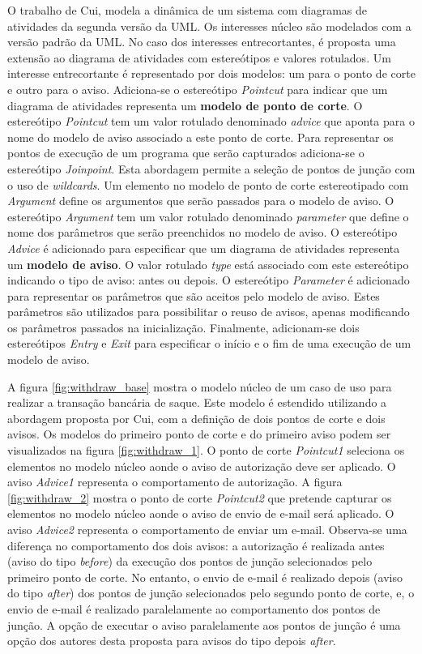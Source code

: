 O trabalho de Cui, \cite{Cui:2009:MIA:1529282.1529377} modela a dinâmica de um sistema com diagramas de atividades da segunda versão da UML. Os
interesses núcleo são modelados com a versão padrão da UML. No caso dos interesses entrecortantes, é proposta uma extensão ao diagrama de atividades com
estereótipos e valores rotulados. Um interesse entrecortante é representado por dois modelos: um para o ponto de corte e outro para o aviso.
Adiciona-se o estereótipo \textit{Pointcut} para indicar que um diagrama de atividades representa um \textbf{modelo de ponto de corte}. O estereótipo
\textit{Pointcut} tem um valor rotulado denominado \textit{advice} que aponta para o nome do modelo de aviso associado a este ponto de corte. Para
representar os pontos de execução de um programa que serão capturados adiciona-se o estereótipo \textit{Joinpoint}. Esta abordagem permite a seleção
de pontos de junção com o uso de \textit{wildcards}. Um elemento no modelo de ponto de corte estereotipado com \textit{Argument} define os argumentos
que serão passados para o modelo de aviso. O estereótipo \textit{Argument} tem um valor rotulado denominado \textit{parameter} que define o nome dos
parâmetros que serão preenchidos no modelo de aviso. O estereótipo \textit{Advice} é adicionado para especificar que um diagrama de atividades
representa um \textbf{modelo de aviso}. O valor rotulado \textit{type} está associado com este estereótipo indicando o tipo de aviso: antes ou depois.
O estereótipo \textit{Parameter} é adicionado para representar os parâmetros que são aceitos pelo modelo de aviso. Estes parâmetros são utilizados
para possibilitar o reuso de avisos, apenas modificando os parâmetros passados na inicialização. Finalmente, adicionam-se dois estereótipos
\textit{Entry} e \textit{Exit} para especificar o início e o fim de uma execução de um modelo de aviso.
 
 A figura \ref{fig:withdraw_base} mostra o modelo núcleo de um caso de uso para realizar a transação bancária de saque. Este modelo é estendido
 utilizando a abordagem proposta por Cui, com a definição de dois pontos de corte e dois avisos. Os modelos do primeiro ponto de corte e do
 primeiro aviso podem ser visualizados na figura \ref{fig:withdraw_1}. O ponto de corte \textit{Pointcut1} seleciona os elementos no modelo núcleo
 aonde o aviso de autorização deve ser aplicado. O aviso \textit{Advice1} representa o comportamento de autorização. A figura \ref{fig:withdraw_2}
 mostra o ponto de corte \textit{Pointcut2} que pretende capturar os elementos no modelo núcleo aonde o aviso de envio de e-mail será
 aplicado. O aviso \textit{Advice2} representa o comportamento de enviar um e-mail. Observa-se uma diferença no comportamento dos dois avisos: a
 autorização é realizada antes (aviso do tipo \textit{before}) da execução dos pontos de junção selecionados pelo primeiro ponto de corte. No entanto,
 o envio de e-mail é realizado depois (aviso do tipo \textit{after}) dos pontos de junção selecionados pelo segundo ponto de corte, e, o envio de
 e-mail é realizado paralelamente ao comportamento dos pontos de junção. A opção de executar o aviso paralelamente aos pontos de junção é uma opção
 dos autores desta proposta para avisos do tipo depois \textit{after}.

